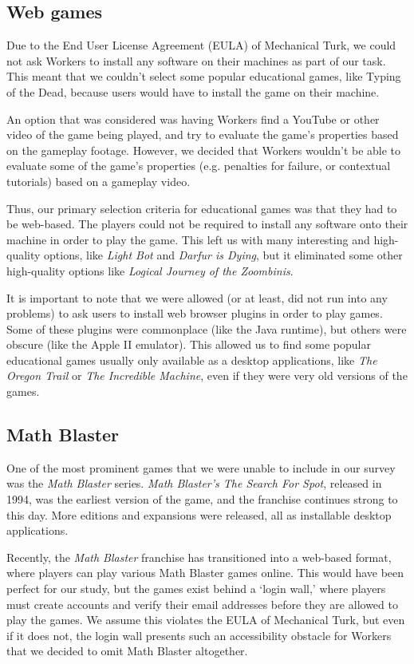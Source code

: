 \documentclass[12pt]{report}
\begin{document}
		\subsection{Web games}
			Due to the End User License Agreement (EULA) of Mechanical Turk, we could not ask Workers to install any software on their machines as part of our task. This meant that we couldn't select some popular educational games, like Typing of the Dead, because users would have to install the game on their machine.

			An option that was considered was having Workers find a YouTube or other video of the game being played, and try to evaluate the game's properties based on the gameplay footage. However, we decided that Workers wouldn't be able to evaluate some of the game's properties (e.g. penalties for failure, or contextual tutorials) based on a gameplay video. 

			Thus, our primary selection criteria for educational games was that they had to be web-based. The players could not be required to install any software onto their machine in order to play the game. This left us with many interesting and high-quality options, like \textit{Light Bot} and \textit{Darfur is Dying}, but it eliminated some other high-quality options like \textit{Logical Journey of the Zoombinis}.

			It is important to note that we were allowed (or at least, did not run into any problems) to ask users to install web browser plugins in order to play games. Some of these plugins were commonplace (like the Java runtime), but others were obscure (like the Apple II emulator). This allowed us to find some popular educational games usually only available as a desktop applications, like \textit{The Oregon Trail} or \textit{The Incredible Machine}, even if they were very old versions of the games.

		\subsection{Math Blaster}
			One of the most prominent games that we were unable to include in our survey was the \textit{Math Blaster} series. \textit{Math Blaster's The Search For Spot}, released in 1994, was the earliest version of the game, and the franchise continues strong to this day. More editions and expansions were released, all as installable desktop applications.

			Recently, the \textit{Math Blaster} franchise has transitioned into a web-based format, where players can play various Math Blaster games online. This would have been perfect for our study, but the games exist behind a `login wall,' where players must create accounts and verify their email addresses before they are allowed to play the games. We assume this violates the EULA of Mechanical Turk, but even if it does not, the login wall presents such an accessibility obstacle for Workers that we decided to omit Math Blaster altogether. 
\end{document}
